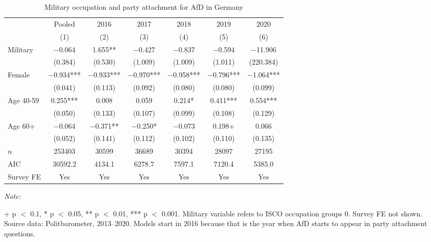 \begin{table}[!h]

\caption{Military occupation and party attachment for AfD in Germany\label{tab:glm_politbaro_att}}
\centering
\begin{threeparttable}
\begin{tabular}[t]{lcccccc}
\toprule
\multicolumn{1}{c}{} & \multicolumn{1}{c}{Pooled} & \multicolumn{1}{c}{2016} & \multicolumn{1}{c}{2017} & \multicolumn{1}{c}{2018} & \multicolumn{1}{c}{2019} & \multicolumn{1}{c}{2020} \\
\cmidrule(l{3pt}r{3pt}){2-2} \cmidrule(l{3pt}r{3pt}){3-3} \cmidrule(l{3pt}r{3pt}){4-4} \cmidrule(l{3pt}r{3pt}){5-5} \cmidrule(l{3pt}r{3pt}){6-6} \cmidrule(l{3pt}r{3pt}){7-7}
  & (1) & (2) & (3) & (4) & (5) & (6)\\
\midrule
Military & \num{-0.064} & \num{1.655}** & \num{-0.427} & \num{-0.837} & \num{-0.594} & \num{-11.906}\\
 & (\num{0.384}) & (\num{0.530}) & (\num{1.009}) & (\num{1.009}) & (\num{1.011}) & (\num{220.384})\\
Female & \num{-0.934}*** & \num{-0.933}*** & \num{-0.970}*** & \num{-0.958}*** & \num{-0.796}*** & \num{-1.064}***\\
 & (\num{0.041}) & (\num{0.113}) & (\num{0.092}) & (\num{0.080}) & (\num{0.080}) & (\num{0.099})\\
Age 40-59 & \num{0.255}*** & \num{0.008} & \num{0.059} & \num{0.214}* & \num{0.411}*** & \num{0.554}***\\
 & (\num{0.050}) & (\num{0.133}) & (\num{0.107}) & (\num{0.099}) & (\num{0.108}) & (\num{0.129})\\
Age 60+ & \num{-0.064} & \num{-0.371}** & \num{-0.250}* & \num{-0.073} & \num{0.198}+ & \num{0.066}\\
 & (\num{0.052}) & (\num{0.141}) & (\num{0.112}) & (\num{0.102}) & (\num{0.110}) & (\num{0.135})\\
\midrule
$n$ & \num{253403} & \num{30599} & \num{36689} & \num{30394} & \num{28097} & \num{27195}\\
AIC & \num{30592.2} & \num{4134.1} & \num{6278.7} & \num{7597.1} & \num{7120.4} & \num{5385.0}\\
Survey FE & Yes & Yes & Yes & Yes & Yes & Yes\\
\bottomrule
\end{tabular}
\begin{tablenotes}[para]
\item \textit{Note: } 
\item + p $<$ 0.1, * p $<$ 0.05, ** p $<$ 0.01, *** p $<$ 0.001. Military variable refers to ISCO occupation groups 0. Survey FE not shown. Source data: Politbarometer, 2013--2020. Models start in 2016 because that is the year when AfD starts to appear in party attachment questions.
\end{tablenotes}
\end{threeparttable}
\end{table}
